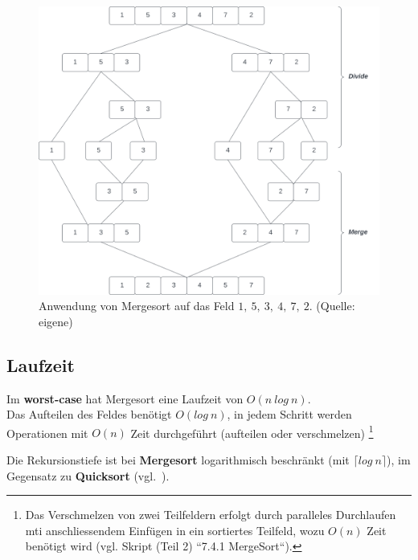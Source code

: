\begin{figure}
    \begin{center}
        \includegraphics[scale=0.3]{chapters/Sortierverfahren/img/mergesort}
        \caption{Anwendung von Mergesort auf das Feld $1,\ 5,\ 3,\ 4,\ 7,\ 2$.  (Quelle: eigene)}
        \label{fig:mergesort}
    \end{center}
\end{figure}


\subsection{Laufzeit}
Im \textbf{worst-case} hat Mergesort eine Laufzeit von $O(n\ log\ n)$.\\
Das Aufteilen des Feldes benötigt $O(log\ n)$, in jedem Schritt werden Operationen mit $O(n)$ Zeit durchgeführt (aufteilen  oder verschmelzen) \footnote{
Das Verschmelzen von zwei Teilfeldern erfolgt durch paralleles Durchlaufen mti anschliessendem Einfügen in ein sortiertes Teilfeld, wozu $O(n)$ Zeit benötigt wird (vgl. Skript (Teil 2) ``7.4.1 MergeSort``).
}

\begin{tcolorbox}
    Die Rekursionstiefe ist bei \textbf{Mergesort} logarithmisch beschränkt (mit $\lceil log\ n \rceil$), im Gegensatz zu \textbf{Quicksort} (vgl.~\cite[116]{OW17b}).
\end{tcolorbox}